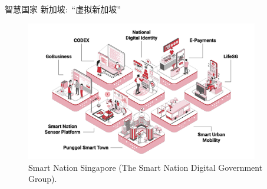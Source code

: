 \begin{frame}{智慧国家}
	新加坡:~``虚拟新加坡''
\begin{figure}[h!]
\centering
     \includegraphics[height=2.4in, width=4.0in, viewport=0 0 1920 1154,clip]{Figures/Smart-city_strategic_national_projects.jpg}
\caption{\tiny \textrm{Smart Nation Singapore (The Smart Nation Digital Government Group).}}%
\label{Fig:Smart-city_strategic_national_projects}
\end{figure}

\end{frame}

